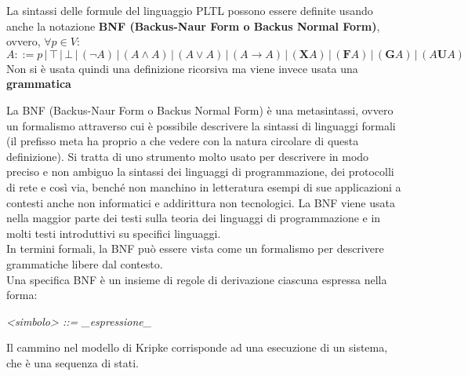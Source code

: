 \begin{definizione}
  La sintassi delle formule del linguaggio PLTL possono essere definite usando
  anche la notazione \textbf{BNF (Backus-Naur Form o Backus Normal Form)},
  ovvero, $\forall p\in V$:
  \[A::=p\,|\,\top\,|\,\bot\,|\,(\neg A)\,|\,(A\land A)\,|\,(A\lor A)\,|\,(A\to
    A)\,|\,(\mathbf{X}A)\,|\,(\mathbf{F}A)\,|\,(\mathbf{G}A)\,|\,(A\mathbf{U}A)
  \] 
  Non si è usata quindi una definizione ricorsiva ma viene invece usata una
  \textbf{grammatica}\\
  \begin{shaded}
    La BNF (Backus-Naur Form o Backus Normal Form) è una metasintassi, ovvero un
    formalismo attraverso cui è possibile descrivere la sintassi di linguaggi
    formali (il prefisso meta ha proprio a che vedere con la natura circolare di
    questa definizione). Si tratta di uno strumento molto usato per descrivere
    in modo preciso e non ambiguo la sintassi dei linguaggi di programmazione,
    dei protocolli di rete e così via, benché non manchino in letteratura esempi
    di sue applicazioni a contesti anche non informatici e addirittura non
    tecnologici. La BNF viene usata nella maggior parte dei testi sulla teoria
    dei linguaggi di programmazione e in molti testi introduttivi su specifici
    linguaggi. \\
    In termini formali, la BNF può essere vista come un formalismo per descrivere
    grammatiche libere dal contesto.  \\
    Una specifica BNF è un insieme di regole di derivazione ciascuna espressa
    nella forma: 
    \begin{center}
      \textit{<simbolo> ::= \_espressione\_}
    \end{center}
  \end{shaded}
\end{definizione}
Il cammino nel modello di Kripke corrisponde ad una esecuzione di un sistema,
che è una sequenza di stati. 

